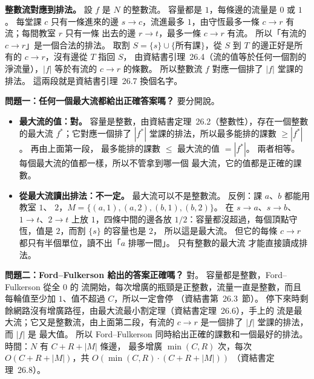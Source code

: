 \begin{pastsoln}
\textbf{整數流對應到排法。} 設 $f$ 是 $N$ 的整數流。 容量都是 $1$，每條邊的流量是 $0$ 或 $1$。 每堂課
$c$ 只有一條進來的邊 $s \to c$，流進最多 $1$，由守恆最多一條 $c \to r$ 有流；每間教室 $r$ 只有一條
出去的邊 $r \to t$，最多一條 $c \to r$ 有流。 所以「有流的 $c \to r$」是一個合法的排法。 取割
$S = \{s\} \cup \{\text{所有課}\}$，從 $S$ 到 $T$ 的邊正好是所有的 $c \to r$，沒有邊從 $T$ 指回 $S$，
由資結書引理~26.4（流的值等於任何一個割的淨流量），$|f|$ 等於有流的 $c \to r$ 的條數。 所以整數流
$f$ 對應一個排了 $|f|$ 堂課的排法。 這兩段就是資結書引理~26.7 換個名字。

\textbf{問題一：任何一個最大流都給出正確答案嗎？} 要分開說。
\begin{itemize}
\item \textbf{最大流的值：對。} 容量是整數，由資結書定理~26.2（整數性），存在一個整數的最大流
$f^{*}$；它對應一個排了 $|f^{*}|$ 堂課的排法，所以最多能排的課數 $\ge |f^{*}|$。 再由上面第一段，
最多能排的課數 $\le$ 最大流的值 $= |f^{*}|$。 兩者相等。 每個最大流的值都一樣，所以不管拿到哪一個
最大流，它的值都是正確的課數。
\item \textbf{從最大流讀出排法：不一定。} 最大流可以不是整數流。 反例：課 $a$、$b$ 都能用教室 $1$、
$2$，$M = \{(a, 1), (a, 2), (b, 1), (b, 2)\}$。 在 $s \to a$、$s \to b$、$1 \to t$、$2 \to t$ 上放
$1$，四條中間的邊各放 $1/2$：容量都沒超過，每個頂點守恆，值是 $2$，而割 $\{s\}$ 的容量也是 $2$，
所以這是最大流。 但它的每條 $c \to r$ 都只有半個單位，讀不出「$a$ 排哪一間」。 只有整數的最大流
才能直接讀成排法。
\end{itemize}

\textbf{問題二：Ford--Fulkerson 給出的答案正確嗎？} 對。 容量都是整數，Ford--Fulkerson 從全 $0$ 的
流開始，每次增廣的瓶頸是正整數，流量一直是整數，而且每輪值至少加 $1$、值不超過 $C$，所以一定會停
（資結書第~26.3~節）。 停下來時剩餘網路沒有增廣路徑，由最大流最小割定理（資結書定理~26.6），手上的
流是最大流；它又是整數流，由上面第二段，有流的 $c \to r$ 是一個排了 $|f|$ 堂課的排法，而 $|f|$ 是
最大值。 所以 Ford--Fulkerson 同時給出正確的課數和一個最好的排法。 時間：$N$ 有 $C + R + |M|$ 條邊，
最多增廣 $\min(C, R)$ 次，每次 $O(C + R + |M|)$，共 $O(\min(C, R) \cdot (C + R + |M|))$
（資結書定理~26.8）。
\end{pastsoln}
